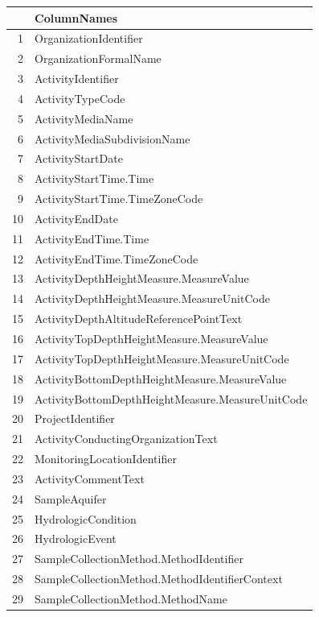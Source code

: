 \documentclass[a4paper,11pt]{article}\usepackage[]{graphicx}\usepackage[]{color}
\begin{document}
\begin{table}[ht]
\centering
\begin{tabular}{rl}
  \hline
 & ColumnNames \\ 
  \hline
1 & OrganizationIdentifier \\ 
  2 & OrganizationFormalName \\ 
  3 & ActivityIdentifier \\ 
  4 & ActivityTypeCode \\ 
  5 & ActivityMediaName \\ 
  6 & ActivityMediaSubdivisionName \\ 
  7 & ActivityStartDate \\ 
  8 & ActivityStartTime.Time \\ 
  9 & ActivityStartTime.TimeZoneCode \\ 
  10 & ActivityEndDate \\ 
  11 & ActivityEndTime.Time \\ 
  12 & ActivityEndTime.TimeZoneCode \\ 
  13 & ActivityDepthHeightMeasure.MeasureValue \\ 
  14 & ActivityDepthHeightMeasure.MeasureUnitCode \\ 
  15 & ActivityDepthAltitudeReferencePointText \\ 
  16 & ActivityTopDepthHeightMeasure.MeasureValue \\ 
  17 & ActivityTopDepthHeightMeasure.MeasureUnitCode \\ 
  18 & ActivityBottomDepthHeightMeasure.MeasureValue \\ 
  19 & ActivityBottomDepthHeightMeasure.MeasureUnitCode \\ 
  20 & ProjectIdentifier \\ 
  21 & ActivityConductingOrganizationText \\ 
  22 & MonitoringLocationIdentifier \\ 
  23 & ActivityCommentText \\ 
  24 & SampleAquifer \\ 
  25 & HydrologicCondition \\ 
  26 & HydrologicEvent \\ 
  27 & SampleCollectionMethod.MethodIdentifier \\ 
  28 & SampleCollectionMethod.MethodIdentifierContext \\ 
  29 & SampleCollectionMethod.MethodName \\ 

\end{tabular}
\end{table}
\end{document}
